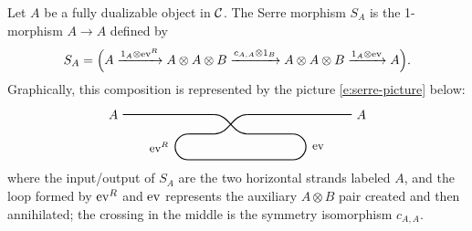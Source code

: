 \begin{definition}\label{d:serre}
  Let $A$ be a fully dualizable object in $\mathcal{C}$. The Serre morphism $S_A$ is the
  1-morphism $A\to A$ defined by
  \begin{equation}\label{e:serre-formula}
    S_A=\Bigl(
     A\xrightarrow{1_A\otimes \operatorname{ev}^R} A\otimes A\otimes B \xrightarrow{c_{A,A}\otimes 1_B}
     A\otimes A\otimes B \xrightarrow{1_A\otimes \operatorname{ev}} A
         \Bigr).
   \end{equation}
   Graphically, this composition is represented by the picture
   \eqref{e:serre-picture} below:
   \begin{equation}\label{e:serre-picture}
     \begin{tikzpicture}[thick, baseline=0, scale=0.9]
       \node[left] at (0,1) {$A$};
       \node[right] at (7,1) {$A$};

       \draw (0,1) -- (2.8,1);

       \draw (2, 0.4) arc (90:270:0.4);
       \node[left] at (1.55,0) {\small$\ev^R$};

       \draw (2, 0.4) -- (2.8, 0.4);

       \draw (2, -0.4) -- (5.2, -0.4);

       \draw (2.8, 1) to[out=0, in=180] (3.8, 0.4);  %
       \draw (2.8, 0.4) to[out=0, in=180] (3.8, 1);  %

       \draw (3.8, 1) -- (7, 1);
       \draw (3.8, 0.4) -- (5.2, 0.4);

       \draw (5.2, 0.4) arc (90:-90:0.4);
       \node[right] at (5.65,0) {\small$\ev$};
     \end{tikzpicture}
   \end{equation}
   where the input/output of $S_A$ are the two horizontal strands labeled $A$,
   and the loop formed by $\operatorname{ev}^R$ and $\operatorname{ev}$ represents the auxiliary
   $A\otimes B$ pair created and then annihilated; the crossing in the middle
   is the symmetry isomorphism $c_{A,A}$.
\end{definition}

